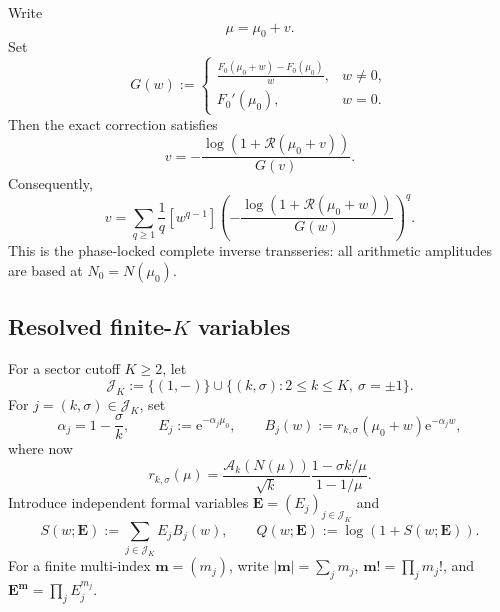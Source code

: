 \documentclass[11pt,a4paper]{article}
\numberwithin{equation}{section}
\theoremstyle{definition}
\theoremstyle{remark}
\newcommand{\e}{\mathrm e}
\newcommand{\Acal}{\mathcal A}
\newcommand{\Rcal}{\mathcal R}
\newcommand{\Jcal}{\mathcal J}
\newcommand{\multi}[1]{\boldsymbol{#1}}
\newcommand{\abs}[1]{\lvert#1\rvert}
\begin{document}
Write
\begin{equation}\label{eq:mu-mu0-v}
 \mu=\mu_0+v.
\end{equation}
Set
\begin{equation}\label{eq:G-core}
 G(w):=
 \begin{cases}
 \displaystyle\frac{F_0(\mu_0+w)-F_0(\mu_0)}{w},&w\neq0,\\[3mm]
 F_0'(\mu_0),&w=0.
 \end{cases}
\end{equation}
Then the exact correction satisfies
\begin{equation}\label{eq:v-fixed-exact}
 v=-\frac{\log(1+\Rcal(\mu_0+v))}{G(v)}.
\end{equation}
Consequently,
\begin{equation}\label{eq:v-LB-exact}
 \boxed{
 v=\sum_{q\geq1}\frac1q[w^{q-1}]
 \left(-\frac{\log(1+\Rcal(\mu_0+w))}{G(w)}\right)^q.}
\end{equation}
This is the phase-locked complete inverse transseries: all arithmetic amplitudes
are based at $N_0=N(\mu_0)$.

\subsection{Resolved \texorpdfstring{finite-$K$}{finite-K} variables}

For a sector cutoff $K\geq2$, let
\begin{equation}\label{eq:JK}
 \Jcal_K:=\{(1,-)\}\cup
 \{(k,\sigma):2\leq k\leq K,\ \sigma=\pm1\}.
\end{equation}
For $j=(k,\sigma)\in\Jcal_K$, set
\begin{equation}\label{eq:E-B}
 \alpha_j=1-\frac\sigma k,
 \qquad E_j:=\e^{-\alpha_j\mu_0},
 \qquad B_j(w):=r_{k,\sigma}(\mu_0+w)\e^{-\alpha_jw},
\end{equation}
where now
\begin{equation}\label{eq:r-cont}
 r_{k,\sigma}(\mu)=
 \frac{\Acal_k(N(\mu))}{\sqrt{k}}
 \frac{1-\sigma k/\mu}{1-1/\mu}.
\end{equation}
Introduce independent formal variables $\multi E=(E_j)_{j\in\Jcal_K}$ and
\begin{equation}\label{eq:S-Q}
 S(w;\multi E):=\sum_{j\in\Jcal_K}E_jB_j(w),
 \qquad Q(w;\multi E):=\log(1+S(w;\multi E)).
\end{equation}
For a finite multi-index $\multi m=(m_j)$, write
$\abs{\multi m}=\sum_jm_j$, $\multi m!=\prod_jm_j!$, and
$\multi E^{\multi m}=\prod_jE_j^{m_j}$.
\end{document}
